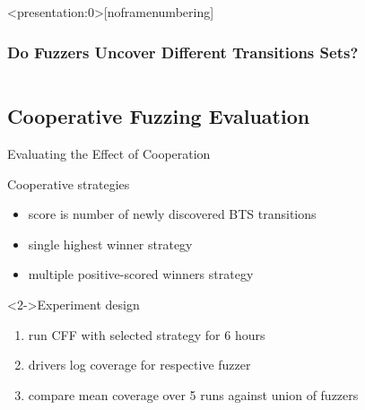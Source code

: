 \documentclass[\HandoutMode,table]{beamer}
\begin{document}
\begin{frame}<presentation:0>[noframenumbering]
    \frametitle{Do Fuzzers Uncover Different Transitions Sets?}
    \vspace{\baselineskip}
    \begin{table}
        \begin{tabular}{l c l c}
            
        \end{tabular}
    \end{table}
    \vspace{\baselineskip}
\end{frame}

\subsection{Cooperative Fuzzing Evaluation}

\begin{frame}{Evaluating the Effect of Cooperation}
    \begin{block}{Cooperative strategies}
        \begin{itemize}
            \item{} score is number of newly discovered BTS transitions
            \item{} single highest winner strategy
            \item{} multiple positive-scored winners strategy
        \end{itemize}
    \end{block}
    \begin{block}<2->{Experiment design}
        \begin{enumerate}
            \item{} run CFF with selected strategy for 6 hours
            \item{} drivers log coverage for respective fuzzer
            \item{} compare mean coverage over 5 runs against union of fuzzers
        \end{enumerate}
    \end{block}
\end{frame}
\end{document}
